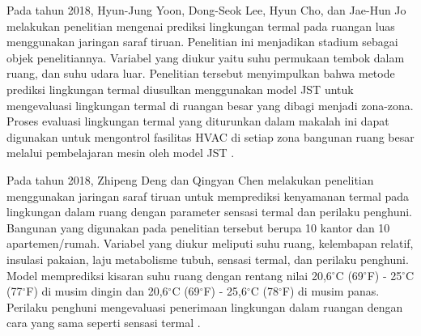 Pada tahun 2018, Hyun-Jung Yoon, Dong-Seok Lee, Hyun Cho, dan Jae-Hun Jo melakukan penelitian mengenai prediksi lingkungan termal pada ruangan luas menggunakan jaringan saraf tiruan. Penelitian ini menjadikan stadium sebagai objek penelitiannya. Variabel yang diukur yaitu suhu permukaan tembok dalam ruang, dan suhu udara luar. Penelitian tersebut menyimpulkan bahwa metode prediksi lingkungan termal diusulkan menggunakan model JST untuk mengevaluasi lingkungan termal di ruangan besar yang dibagi menjadi zona-zona. Proses evaluasi lingkungan termal yang diturunkan dalam makalah ini dapat digunakan untuk mengontrol fasilitas HVAC di setiap zona bangunan ruang besar melalui pembelajaran mesin oleh model JST \cite{article16}.

Pada tahun 2018, Zhipeng Deng dan Qingyan Chen melakukan penelitian menggunakan jaringan saraf tiruan untuk memprediksi kenyamanan termal pada lingkungan dalam ruang dengan parameter sensasi termal dan perilaku penghuni. Bangunan yang digunakan pada penelitian tersebut berupa 10 kantor dan 10 apartemen/rumah. Variabel yang diukur meliputi suhu ruang, kelembapan relatif, insulasi pakaian, laju metabolisme tubuh, sensasi termal, dan perilaku penghuni. Model memprediksi kisaran suhu ruang dengan rentang nilai 20,6$^{\circ}$C (69$^{\circ}$F) - 25$^{\circ}$C (77$^{\circ}$F) di musim dingin dan 20,6$^{\circ}$C (69$^{\circ}$F) - 25,6$^{\circ}$C (78$^{\circ}$F) di musim panas. Perilaku penghuni mengevaluasi penerimaan lingkungan dalam ruangan dengan cara yang sama seperti sensasi termal \cite{article17}.

